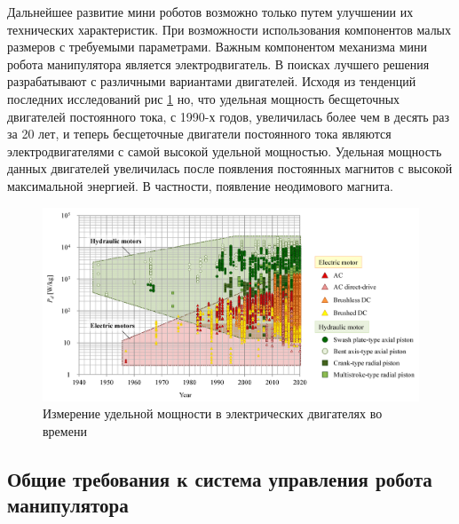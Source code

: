 Дальнейшее развитие мини роботов возможно только путем улучшении  их технических характеристик. При возможности использования компонентов малых размеров с требуемыми параметрами. Важным компонентом механизма мини робота манипулятора является электродвигатель. В поисках лучшего решения разрабатывают с различными вариантами двигателей. Исходя из тенденций последних исследований \citep{Sakama2022} рис \ref{magnets} но, что удельная мощность бесщеточных двигателей постоянного тока, с 1990-х годов, увеличилась более чем в десять раз за 20 лет, и теперь бесщеточные двигатели постоянного тока являются электродвигателями с самой высокой удельной мощностью. Удельная мощность данных двигателей увеличилась после появления постоянных магнитов с высокой максимальной энергией. В частности, появление неодимового магнита.

\begin{figure}[H]
	\centering
	\includegraphics[width=\textwidth]{Src/images/magnets.png}
	\caption{Измерение удельной мощности в электрических двигателях во времени \citep{Sakama2022}}
	\label{magnets}
\end{figure}

\subsection{ Общие требования к система управления робота манипулятора}

